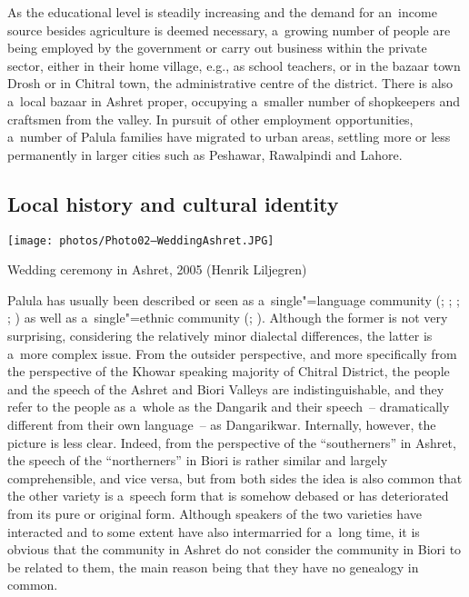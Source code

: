 As the educational level is steadily increasing and the demand for an~income source besides agriculture is deemed necessary, a~growing number of people are being employed by the government or carry out business within the private sector, either in their home village, e.g., as school teachers, or in the bazaar town Drosh or in Chitral town, the administrative centre of the district. There is also a~local bazaar in Ashret proper, occupying a~smaller number of shopkeepers and craftsmen from the valley. In pursuit of other employment opportunities, a~number of Palula families have migrated to urban areas, settling more or less permanently in larger cities such as Peshawar, Rawalpindi and Lahore.
 
\subsection{Local history and cultural identity}\label{Local history and cultural identity}
\label{subsec:1-2-3}
\begin{photofigure}
 \texttt{[image: photos/Photo02--WeddingAshret.JPG]}
\caption{Wedding ceremony in Ashret, 2005 (Henrik Liljegren)}
\label{fig:1:weddingphoto}
\end{photofigure}


Palula has usually been described or seen as a~single"=language community (\citealt[7]{morgenstierne1941}; \citealt[67]{decker1992a}; \citeyear[160]{decker1996}; \citealt[21]{masica1991}; \citealt[253, 258]{strand2001}) as well as a~single"=ethnic community (\citealt[79--143]{cacopardo2001}; \citealt[5]{akhunzadaliljegren2009}). Although the former is not very surprising, considering the relatively minor dialectal differences, the latter is a~more complex issue. From the outsider perspective, and more specifically from the perspective of the Khowar speaking majority of Chitral District, the people and the speech of the Ashret and Biori Valleys are indistinguishable, and they refer to the people as a~whole as the Dangarik and their speech~-- dramatically different from their own language~-- as Dangarikwar. Internally, however, the picture is less clear. Indeed, from the perspective of the ``southerners'' in Ashret, the speech of the ``northerners'' in Biori is rather similar and largely comprehensible, and vice versa, but from both sides the idea is also common that the other variety is a~speech form that is somehow debased or has deteriorated from its pure or original form. Although speakers of the two varieties have interacted and to some extent have also intermarried for a~long time, it is obvious that the community in Ashret do not consider the community in Biori to be related to them, the main reason being that they have no genealogy in common. 

